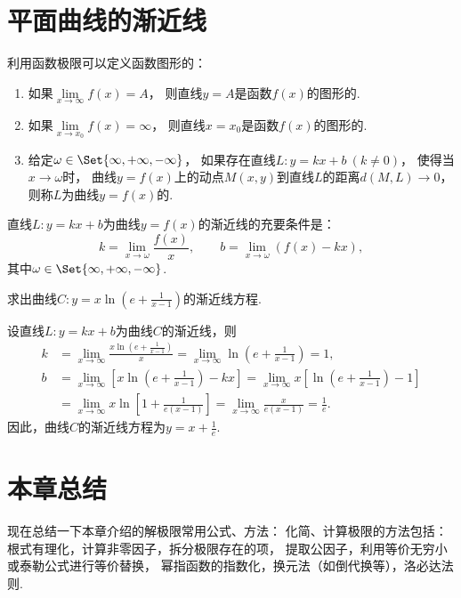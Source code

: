 \section{平面曲线的渐近线}
\begin{definition}
利用函数极限可以定义函数图形的：
\begin{enumerate}
	\item 如果\(\lim\limits_{x \to \infty}f(x) = A\)，
	则直线\(y = A\)是函数\(f(x)\)的图形的.
	\item 如果\(\lim\limits_{x \to x_0}f(x) = \infty\)，
	则直线\(x = x_0\)是函数\(f(x)\)的图形的.
	\item 给定\(\omega\in\Set{\infty,+\infty,-\infty}\)，
	如果存在直线\(L: y = kx+b\ (k \neq 0)\)，
	使得当\(x\to\omega\)时，
	曲线\(y = f(x)\)上的动点\(M(x,y)\)到直线\(L\)的距离\(d(M,L)\to0\)，
	则称\(L\)为曲线\(y = f(x)\)的.
\end{enumerate}
\end{definition}

\begin{theorem}
直线\(L: y = kx+b\)为曲线\(y = f(x)\)的渐近线的充要条件是：\[
	k = \lim\limits_{x\to\omega} \frac{f(x)}{x},
	\qquad
	b = \lim\limits_{x\to\omega} (f(x) - kx),
\]
其中\(\omega\in\Set{\infty,+\infty,-\infty}\).
\end{theorem}

\begin{example}
求出曲线\(C: y = x \ln\left(e+\frac{1}{x-1}\right)\)的渐近线方程.
\begin{solution}
设直线\(L: y = kx+b\)为曲线\(C\)的渐近线，则\begin{align*}
	k &= \lim\limits_{x\to\infty} \frac{x \ln\left(e+\frac{1}{x-1}\right)}{x}
	= \lim\limits_{x\to\infty} \ln\left(e+\frac{1}{x-1}\right)
	= 1, \\
	b &= \lim\limits_{x\to\infty} \left[ x \ln\left(e+\frac{1}{x-1}\right) - kx \right]
	= \lim\limits_{x\to\infty} x \left[ \ln\left(e+\frac{1}{x-1}\right) - 1 \right] \\
	&= \lim\limits_{x\to\infty} x \ln\left[1+\frac{1}{e(x-1)}\right]
	= \lim\limits_{x\to\infty} \frac{x}{e(x-1)}
	= \frac{1}{e}.
\end{align*}
因此，曲线\(C\)的渐近线方程为\(y = x + \frac{1}{e}\).
\end{solution}
\end{example}

\section{本章总结}
现在总结一下本章介绍的解极限常用公式、方法：
化简、计算极限的方法包括：
根式有理化，计算非零因子，拆分极限存在的项，
提取公因子，利用等价无穷小或泰勒公式进行等价替换，
幂指函数的指数化，换元法（如倒代换等），洛必达法则.


